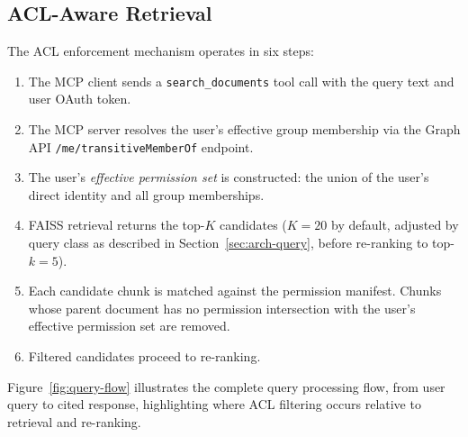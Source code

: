 \subsection{ACL-Aware Retrieval}
\label{subsec:acl-retrieval}

The ACL enforcement mechanism operates in six steps:

\begin{enumerate}
  \item The MCP client sends a \texttt{search\_documents} tool call with the query text and user OAuth token.
  \item The MCP server resolves the user's effective group membership via the Graph API \texttt{/me/transitiveMemberOf} endpoint.
  \item The user's \textit{effective permission set} is constructed: the union of the user's direct identity and all group memberships.
  \item FAISS retrieval returns the top-$K$ candidates ($K = 20$ by default, adjusted by query class as described in Section~\ref{sec:arch-query}, before re-ranking to top-$k = 5$).
  \item Each candidate chunk is matched against the permission manifest. Chunks whose parent document has no permission intersection with the user's effective permission set are removed.
  \item Filtered candidates proceed to re-ranking.
\end{enumerate}

Figure~\ref{fig:query-flow} illustrates the complete query processing flow, from user query to cited response, highlighting where ACL filtering occurs relative to retrieval and re-ranking.

